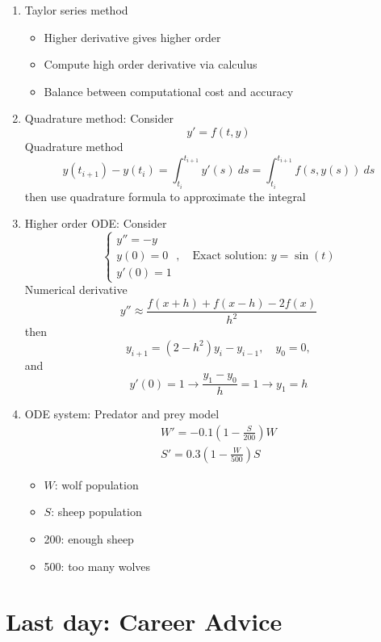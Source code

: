 \documentclass{article}
\theoremstyle{remark}
\begin{document}
\begin{enumerate}
\item Taylor series method
\begin{itemize}
\item Higher derivative gives higher order
\item Compute high order derivative via calculus
\item Balance between computational cost and accuracy
\end{itemize}

\item Quadrature method: Consider
$$
y' = f(t,y)
$$
Quadrature method
$$
y(t_{i+1}) -y(t_i) = \int_{t_i}^{t_{i+1}}y'(s)~ds = \int_{t_i}^{t_{i+1}}f(s,y(s))~ds
$$
then use quadrature formula to approximate the integral

\item Higher order ODE: Consider
$$
\left\{\begin{array}{l}
y'' = -y\\
y(0) = 0\\
y'(0) = 1\end{array}\right.,\quad \text{Exact solution: } y = \sin(t)
$$
Numerical derivative
$$
y'' \approx \frac{f(x+h)+f(x-h)-2f(x)}{h^2}
$$
then
$$
y_{i+1} = (2-h^2)y_i-y_{i-1}, \quad y_0 = 0,
$$
and
$$
y'(0) = 1\rightarrow \frac{y_1-y_0}{h} = 1 \rightarrow y_1 = h
$$

\item ODE system: Predator and prey model
$$
\begin{array}{ll}
W' = -0.1(1-\frac{S}{200})W\\
S' = 0.3(1-\frac{W}{500})S
\end{array}
$$
\begin{itemize}
\item $W$: wolf population
\item $S$: sheep population
\item 200: enough sheep
\item 500: too many wolves
\end{itemize}
\end{enumerate}


\section{Last day: Career Advice}
\end{document}
